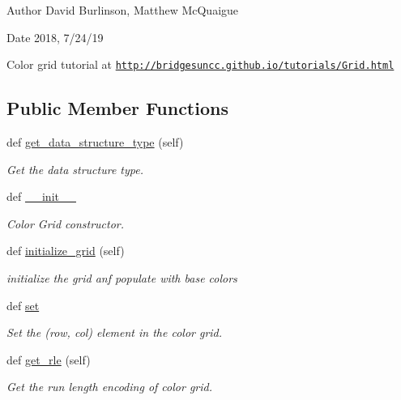 \begin{DoxyAuthor}{Author}
David Burlinson, Matthew Mc\+Quaigue
\end{DoxyAuthor}
\begin{DoxyDate}{Date}
2018, 7/24/19
\end{DoxyDate}
Color grid tutorial at \href{http://bridgesuncc.github.io/tutorials/Grid.html}{\tt http\+://bridgesuncc.\+github.\+io/tutorials/\+Grid.\+html} \subsection*{Public Member Functions}
\begin{DoxyCompactItemize}
\item 
def \hyperlink{classbridges_1_1color__grid_1_1_color_grid_a4dbf23124fdc8edae222c100cf7b9363}{get\+\_\+data\+\_\+structure\+\_\+type} (self)
\begin{DoxyCompactList}\small\item\em Get the data structure type. \end{DoxyCompactList}\item 
def \hyperlink{classbridges_1_1color__grid_1_1_color_grid_aa4b484e518b5fc0c970ea36e8500dbe5}{\+\_\+\+\_\+init\+\_\+\+\_\+}
\begin{DoxyCompactList}\small\item\em Color Grid constructor. \end{DoxyCompactList}\item 
def \hyperlink{classbridges_1_1color__grid_1_1_color_grid_ad2b3ab19751cbf629096a25e31bb7f42}{initialize\+\_\+grid} (self)
\begin{DoxyCompactList}\small\item\em initialize the grid anf populate with base colors \end{DoxyCompactList}\item 
def \hyperlink{classbridges_1_1color__grid_1_1_color_grid_a746dde66b828253bd0dfb32c906729fe}{set}
\begin{DoxyCompactList}\small\item\em Set the (row, col) element in the color grid. \end{DoxyCompactList}\item 
def \hyperlink{classbridges_1_1color__grid_1_1_color_grid_a48ded4391e60e4f42213fb3711730614}{get\+\_\+rle} (self)
\begin{DoxyCompactList}\small\item\em Get the run length encoding of color grid. \end{DoxyCompactList}\item 

\end{DoxyCompactItemize}
